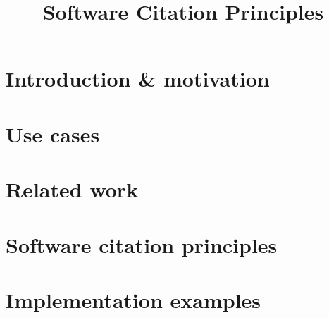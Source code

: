 \documentclass[11pt, oneside]{amsart}
\title{Software Citation Principles}
\author{}
\date{}
\begin{document}
\maketitle

\begin{abstract}
\end{abstract}



\section{Introduction \& motivation}
\label{sec:intro}



\section{Use cases}
\label{sec:use_cases}



\section{Related work}
\label{sec:related_work}



\section{Software citation principles}
\label{sec:principles}



\section{Implementation examples}
\label{sec:examples}
\end{document}
